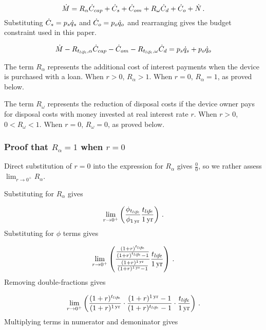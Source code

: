 \begin{equation}
  \dot{M} = R_\alpha \dot{C}_{cap} + 
             \dot{C}_s + 
             \dot{C}_{om} + 
             R_\omega \dot{C}_d + 
             \dot{C}_o + 
             \dot{N} \, .
\end{equation}
%
Substituting $\dot{C}_s = p_s \dot{q}_s$ and 
$\dot{C}_o = p_o \dot{q}_o$ and rearranging gives
the budget constraint used in this paper.

\begin{equation}
  \dot{M} - R_{t_{li\!f\!e},\alpha} \dot{C}_{cap} - \dot{C}_{om} - R_{t_{li\!f\!e},\omega} \dot{C}_d = p_s \dot{q}_s + p_o \dot{q}_o
\end{equation}

The term $R_\alpha$ represents the additional cost of interest
payments when the device is purchased with a loan.
When $r > 0$, $R_\alpha > 1$.
When $r = 0$, $R_\alpha = 1$, as proved below.

The term $R_\omega$ represents the reduction of disposal costs 
if the device owner pays for disposal costs with money
invested at real interest rate $r$. 
When $r > 0$, $0 < R_\omega < 1$.
When $r = 0$, $R_\omega = 0$, as proved below.


\subsubsection{Proof that $R_\alpha = 1$ when $r = 0$}

Direct substitution of $r = 0$ into the expression
for $R_\alpha$ gives $\frac{0}{0}$, 
so we rather assess
$\lim_{r \to 0^+} R_\alpha$.

Substituting for $R_\alpha$ gives

\begin{equation}
  \lim_{r \to 0^+} \left( \frac{\phi_{t_{li\!f\!e}}}{\phi_{1\,\mathrm{yr}}} \frac{t_{li\!f\!e}}{1\,\mathrm{yr}} \right) \, .
\end{equation}
%
Substituting for $\phi$ terms gives

\begin{equation}
  \lim_{r \to 0^+} \left( \frac{\frac{(1 + r)^{t_{li\!f\!e}}}{(1 + r)^{t_{li\!f\!e}} - 1}}{\frac{(1 + r)^{1\,\mathrm{yr}}}{(1 + r)^{1\,\mathrm{yr}} - 1}} \frac{t_{li\!f\!e}}{1\,\mathrm{yr}} \right) \, .
\end{equation}
%
Removing double-fractions gives

\begin{equation}
  \lim_{r \to 0^+} \left(
  \frac{(1 + r)^{t_{li\!f\!e}}}{(1 + r)^{1\,\mathrm{yr}}} \cdot
  \frac{(1 + r)^{1\,\mathrm{yr}} - 1}{(1 + r)^{t_{li\!f\!e}} - 1} \cdot
  \frac{t_{li\!f\!e}}{1\,\mathrm{yr}}
  \right) \, .
\end{equation}
%
Multiplying terms in numerator and demoninator gives

